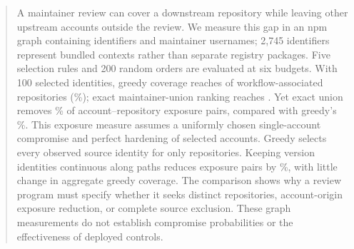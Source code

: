 \begin{abstract}
A maintainer review can cover a downstream repository while leaving other upstream accounts outside the review. We measure this gap in an npm graph containing \StudyPackages{} identifiers and \StudyMaintainers{} maintainer usernames; 2,745 identifiers represent bundled contexts rather than separate registry packages. Five selection rules and 200 random orders are evaluated at six budgets. With 100 selected identities, greedy coverage reaches \GreedyCovered{} of \StudyWorkflowRepos{} workflow-associated repositories (\GreedyCoveragePercent{}\%); exact maintainer-union ranking reaches \UnionCovered{}. Yet exact union removes \UnionExposurePercent{}\% of account--repository exposure pairs, compared with greedy's \GreedyExposurePercent{}\%. This exposure measure assumes a uniformly chosen single-account compromise and perfect hardening of selected accounts. Greedy selects every observed source identity for only \GreedyExcluded{} repositories. Keeping version identities continuous along paths reduces exposure pairs by \VersionPairsDecreasePercent{}\%, with little change in aggregate greedy coverage. The comparison shows why a review program must specify whether it seeks distinct repositories, account-origin exposure reduction, or complete source exclusion. These graph measurements do not establish compromise probabilities or the effectiveness of deployed controls.
\end{abstract}
